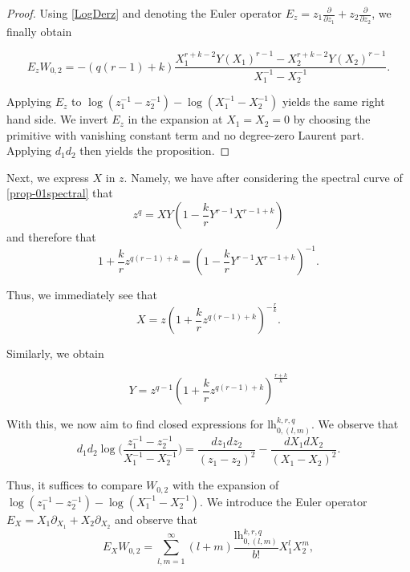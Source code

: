 \documentclass[10pt,a4paper,oneside,no-math,reqno]{amsart}%
\theoremstyle{plain}
\theoremstyle{definition}
\theoremstyle{remark}
\numberwithin{equation}{section}
\newcommand{\1}{\mathds{1}}
\newcommand{\<}{\langle}
\renewcommand{\>}{\rangle}
\newcommand{\lh}{\mathord{\mathrm{l\!h}}}
\begin{document}
\begin{proof}
    Using \cref{LogDerz} and denoting the Euler operator $E_z = z_1 \frac{\partial}{\partial z_1} + z_2\frac{\partial}{\partial z_2}$, we finally obtain

    \begin{equation}
        E_zW_{0,2}=-(q(r-1)+k)\frac{X_1^{r+k-2} Y(X_1)^{r-1} - X_2^{r+k-2} Y(X_2)^{r-1}}{X_1^{-1} - X_2^{-1}}.
    \end{equation}

    Applying $E_z$ to $\log (z_1^{-1} - z_2^{-1}) - \log (X_1^{-1} - X_2^{-1})$ yields the same right hand side. We invert $E_z$ in the expansion at $X_1=X_2=0$ by choosing the primitive with vanishing constant term and no degree-zero Laurent part. Applying $d_1d_2$ then yields the proposition.
\end{proof}



Next, we express $X$ in $z$. Namely, we have after considering the spectral curve of \cref{prop-01spectral} that
\begin{equation}
    z^q=XY(1-\frac{k}{r}Y^{r-1}X^{r-1+k})
\end{equation}
and therefore that
\begin{equation}
    1+\frac{k}{r}z^{q(r-1)+k}
    =
    (1-\frac{k}{r} Y^{r-1}X^{r-1+k})^{-1}.
\end{equation}

Thus, we immediately see that
\begin{equation}
\label{equ-xviaz}
    X
    =
    z(1+\frac{k}{r}z^{q(r-1)+k})^{-\frac{r}{k}}.
\end{equation}

Similarly, we obtain

\begin{equation}
\label{equ-yviaz}
    Y
    =
    z^{q-1}(1+\frac{k}{r}z^{q(r-1)+k})^{\frac{r+k}{k}}
\end{equation}




With this, we now aim to find closed expressions for $\lh_{0,(l,m)}^{k,r,q}$. We observe that
\begin{equation}
    d_1 d_2 \log \big( \frac{z_1^{-1} - z_2^{-1}}{X_1^{-1} - X_2^{-1}} \big)
    =
    \frac{dz_1 dz_2}{(z_1 - z_2)^2} - \frac{dX_1 dX_2}{(X_1 - X_2)^2}.
\end{equation}

Thus, it suffices to compare $W_{0,2}$ with the expansion of $\log ( z_1^{-1} - z_2^{-1}) - \log ( X_1^{-1} - X_2^{-1}) $. We introduce the Euler operator $E_X = X_1 \partial_{X_1} + X_2 \partial_{X_2} $ and observe that
\begin{equation}
    E_X W_{0,2}
    =
    \sum_{l,m=1}^\infty (l+m) \frac{\lh_{0,(l,m)}^{k,r,q}}{b!} X_1^l X_2^m,
\end{equation}
\end{document}
